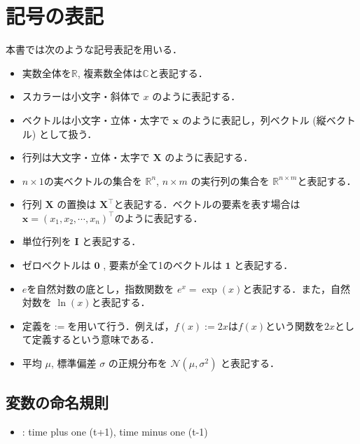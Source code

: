 \section{記号の表記
}


本書では次のような記号表記を用いる．

\begin{itemize}
\item 実数全体を$\mathbb{R}$, 複素数全体は$\mathbb{C}$と表記する．

\item スカラーは小文字・斜体で $x$ のように表記する．

\item ベクトルは小文字・立体・太字で $\mathbf{x}$ のように表記し，列ベクトル (縦ベクトル) として扱う．

\item 行列は大文字・立体・太字で $\mathbf{X}$ のように表記する．

\item $n\times 1$の実ベクトルの集合を $\mathbb{R}^n$, $n\times m$ の実行列の集合を $\mathbb{R}^{n\times m}$と表記する．

\item 行列 $\mathbf{X}$ の置換は $\mathbf{X}^\top$と表記する．ベクトルの要素を表す場合は $\mathbf{x} = (x_1, x_2,\cdots, x_n)^\top$のように表記する．

\item 単位行列を $\mathbf{I}$ と表記する．

\item ゼロベクトルは $\mathbf{0}$ , 要素が全て1のベクトルは $\mathbf{1}$ と表記する．  

\item $e$を自然対数の底とし，指数関数を $e^x=\exp(x)$と表記する．また，自然対数を $\ln(x)$と表記する．

\item 定義を$:=$を用いて行う．例えば，$f(x):=2x$は$f(x)$という関数を$2x$として定義するという意味である．

\item 平均 $\mu$, 標準偏差 $\sigma$ の正規分布を $\mathcal{N}(\mu, \sigma^2)$ と表記する．

\end{itemize}


\subsection{変数の命名規則
}


\begin{itemize}
\item {} : time plus one (t+1), time minus one (t-1)
\end{itemize}
